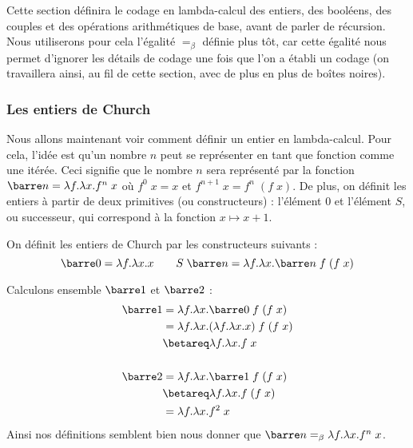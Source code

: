 Cette section définira le codage en lambda-calcul des entiers, des booléens, des couples et des opérations arithmétiques de base, avant de parler de récursion. Nous utiliserons pour cela l'égalité $=_\beta$ définie plus tôt, car cette égalité nous permet d'ignorer les détails de codage une fois que l'on a établi un codage (on travaillera ainsi, au fil de cette section, avec de plus en plus de boîtes noires).

\subsubsection{Les entiers de Church}

Nous allons maintenant voir comment définir un entier en lambda-calcul. Pour cela, l'idée est qu'un nombre $n$ peut se représenter en tant que fonction comme une itérée. Ceci signifie que le nombre $n$ sera représenté par la fonction $\barre n = \lambda f.\lambda x. f^n\;x$ où $f^0\; x = x$ et $f^{n+1}\; x = f^n\;(f\;x)$. De plus, on définit les entiers à partir de deux primitives (ou constructeurs) : l'élément $0$ et l'élément $S$, ou successeur, qui correspond à la fonction $x\mapsto x+1$.

\begin{defi}
    On définit les entiers de Church par les constructeurs suivants :
    $$\barre 0 = \lambda f.\lambda x. x\qquad S\; \barre n = \lambda f.\lambda x. \barre n\; f\; (f\; x)$$
\end{defi}

\begin{expl}
    Calculons ensemble $\barre 1$ et $\barre 2$ :
    \begin{align*}
        \barre 1 &= \lambda f.\lambda x.\barre 0\; f\; (f\; x)\\
        &= \lambda f.\lambda x.(\lambda f.\lambda x. x)\; f\; (f\; x)\\
        &\betareq \lambda f.\lambda x. f\; x\\
        \\
        \barre 2 &= \lambda f.\lambda x.\barre 1\; f\; (f\; x)\\
        &\betareq \lambda f.\lambda x.f\; (f\; x)\\
        &= \lambda f.\lambda x.f^2\; x\\
    \end{align*}
    Ainsi nos définitions semblent bien nous donner que $\barre n =_\beta \lambda f.\lambda x. f^n\;x$.
\end{expl}

